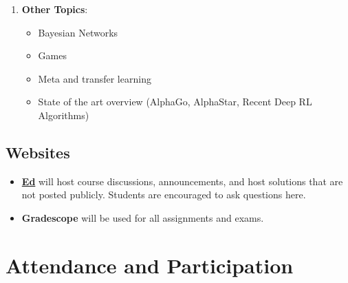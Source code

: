 \documentclass[9pt]{article}
\begin{document}
\begin{enumerate}[noitemsep]
\begin{multicols}{2}
\begin{itemize}[noitemsep]
            \item Hidden Markov models
            \item Bayesian filters
            \item Particle filters
            \item Partially observable Markov decision processes (POMDPs)
            \item Exact POMDP methods
            \item Offline POMDP methods
            \item Online POMDP methods
            \item QMDP
        \end{itemize}
        \end{multicols}
    \item \textbf{Other Topics}:
        \begin{multicols}{2}
        \begin{itemize}[noitemsep]
            \item Bayesian Networks
            \item Games
            \item Meta and transfer learning
            \item State of the art overview (AlphaGo, AlphaStar, Recent Deep RL Algorithms)
        \end{itemize}
        \end{multicols}
\end{enumerate}

\begin{samepage}
\section*{Websites}

\begin{itemize}[nosep]
    \item \href{https://edstem.org/}{\textbf{Ed}} will host course discussions, announcements, and host solutions that are not posted publicly. Students are encouraged to ask questions here.
    \item \textbf{Gradescope} will be used for all assignments and exams.
\end{itemize}

\end{samepage}

\section*{Attendance and Participation}
\end{document}
